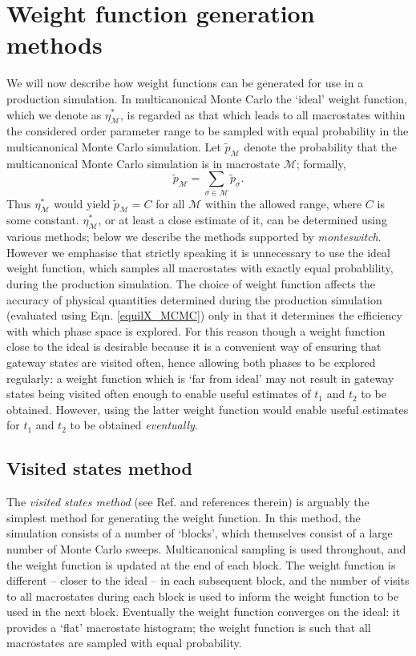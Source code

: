 \documentclass{report}
\begin{document}
\section{Weight function generation methods}\label{sec:weight_generation}
We will now describe how weight functions can be generated for use in a production simulation.
In multicanonical Monte Carlo the `ideal' weight function, which we denote as $\eta_{\mathcal{M}}^*$, is regarded as that which leads to 
all macrostates within the considered order parameter range to be sampled with equal probability in the multicanonical Monte Carlo simulation.
Let $\tilde{p}_{\mathcal{M}}$ denote the probability that the multicanonical Monte Carlo simulation is in macrostate $\mathcal{M}$; formally,
\begin{equation}
\tilde{p}_{\mathcal{M}}=\sum_{\sigma\in\mathcal{M}}\tilde{p}_{\sigma}.
\end{equation}
Thus $\eta_{\mathcal{M}}^*$ would yield $\tilde{p}_{\mathcal{M}}=C$ for all $\mathcal{M}$ within the allowed range, where $C$ is some constant.
$\eta^*_{\mathcal{M}}$, or at least a close estimate of it, can be determined using various methods; below we 
describe the methods supported by \emph{monteswitch}. 
However we emphasise that strictly speaking it is unnecessary to use the ideal weight function, which samples all macrostates with exactly equal 
probablility, during the
production simulation. The choice of weight function affects the accuracy of physical quantities determined during the production simulation
(evaluated using Eqn. \eqref{equilX_MCMC}) only in that it determines the efficiency with which phase space is explored. For this reason though a
weight function close to the ideal is desirable because it is a convenient way of ensuring that gateway states are visited often, hence 
allowing both phases to be explored regularly: a weight function which is `far from ideal' may not result in gateway states being visited often
enough to enable useful estimates of $t_1$ and $t_2$ to be obtained. However, using the latter weight function would enable useful estimates 
for $t_1$ and $t_2$ to be obtained \emph{eventually}.

\subsection{Visited states method}\label{sec:visited_states}
The \emph{visited states method} (see Ref. \cite{Smith_1995} and references therein) is arguably the simplest method for generating the weight function. 
In this method, the simulation consists of a number of
`blocks', which themselves consist of a large number of Monte Carlo sweeps. Multicanonical sampling is used throughout, and the weight function is updated at
the end of each block. The weight function is different -- closer to the ideal -- in each subsequent block, and the number of visits to all macrostates
during each block is used to inform the weight function to be used in the next block. Eventually the weight function converges on the 
ideal: it provides a `flat' macrostate histogram; the weight function is such that all macrostates are sampled with equal probability.
\end{document}
